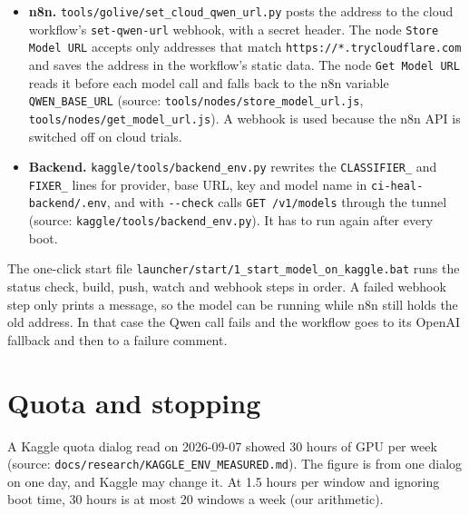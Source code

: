 \documentclass[11pt,a4paper]{report}
\begin{document}
\begin{itemize}[leftmargin=*,itemsep=2pt]
\item \textbf{n8n.} \texttt{tools/\allowbreak{}golive/\allowbreak{}set\_\allowbreak{}cloud\_\allowbreak{}qwen\_\allowbreak{}url.\allowbreak{}py} posts the address to the cloud workflow's \texttt{set-\allowbreak{}qwen-\allowbreak{}url} webhook, with a secret header. The node \texttt{Store Model URL} accepts only addresses that match \texttt{https:/\allowbreak{}/\allowbreak{}*.\allowbreak{}trycloudflare.\allowbreak{}com} and saves the address in the workflow's static data. The node \texttt{Get Model URL} reads it before each model call and falls back to the n8n variable \texttt{QWEN\_\allowbreak{}BASE\_\allowbreak{}URL} (source: \texttt{tools/\allowbreak{}nodes/\allowbreak{}store\_\allowbreak{}model\_\allowbreak{}url.\allowbreak{}js}, \texttt{tools/\allowbreak{}nodes/\allowbreak{}get\_\allowbreak{}model\_\allowbreak{}url.\allowbreak{}js}). A webhook is used because the n8n API is switched off on cloud trials.
\item \textbf{Backend.} \texttt{kaggle/\allowbreak{}tools/\allowbreak{}backend\_\allowbreak{}env.\allowbreak{}py} rewrites the \texttt{CLASSIFIER\_\allowbreak{}} and \texttt{FIXER\_\allowbreak{}} lines for provider, base URL, key and model name in \texttt{ci-\allowbreak{}heal-\allowbreak{}backend/\allowbreak{}.\allowbreak{}env}, and with \texttt{-\allowbreak{}-\allowbreak{}check} calls \texttt{GET /\allowbreak{}v1/\allowbreak{}models} through the tunnel (source: \texttt{kaggle/\allowbreak{}tools/\allowbreak{}backend\_\allowbreak{}env.\allowbreak{}py}). It has to run again after every boot.
\end{itemize}

The one-click start file \texttt{launcher/\allowbreak{}start/\allowbreak{}1\_\allowbreak{}start\_\allowbreak{}model\_\allowbreak{}on\_\allowbreak{}kaggle.\allowbreak{}bat} runs the status check, build, push, watch and webhook steps in order. A failed webhook step only prints a message, so the model can be running while n8n still holds the old address. In that case the Qwen call fails and the workflow goes to its OpenAI fallback and then to a failure comment.

\section{Quota and stopping}

A Kaggle quota dialog read on 2026-09-07 showed 30 hours of GPU per week (source: \texttt{docs/\allowbreak{}research/\allowbreak{}KAGGLE\_\allowbreak{}ENV\_\allowbreak{}MEASURED.\allowbreak{}md}). The figure is from one dialog on one day, and Kaggle may change it. At 1.5 hours per window and ignoring boot time, 30 hours is at most 20 windows a week (our arithmetic).
\end{document}
